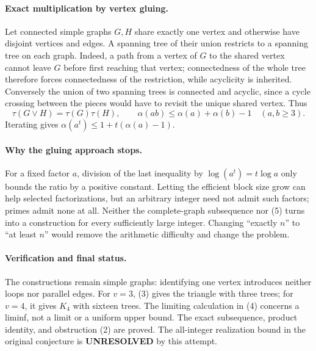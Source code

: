 \documentclass[11pt,a4paper]{article}
\begin{document}
\paragraph{Exact multiplication by vertex gluing.}
Let connected simple graphs $G,H$ share exactly one vertex and otherwise have disjoint vertices and edges. A spanning tree of their union restricts to a spanning tree on each graph. Indeed, a path from a vertex of $G$ to the shared vertex cannot leave $G$ before first reaching that vertex; connectedness of the whole tree therefore forces connectedness of the restriction, while acyclicity is inherited. Conversely the union of two spanning trees is connected and acyclic, since a cycle crossing between the pieces would have to revisit the unique shared vertex. Thus
\[
 \tau(G\vee H)=\tau(G)\tau(H),\qquad
 \alpha(ab)\le\alpha(a)+\alpha(b)-1 \quad(a,b\ge3). \tag{5}
\]
Iterating gives $\alpha(a^t)\le1+t(\alpha(a)-1)$.

\paragraph{Why the gluing approach stops.}
For a fixed factor $a$, division of the last inequality by $\log(a^t)=t\log a$ only bounds the ratio by a positive constant. Letting the efficient block size grow can help selected factorizations, but an arbitrary integer need not admit such factors; primes admit none at all. Neither the complete-graph subsequence nor (5) turns into a construction for every sufficiently large integer. Changing ``exactly $n$'' to ``at least $n$'' would remove the arithmetic difficulty and change the problem.

\paragraph{Verification and final status.}
The constructions remain simple graphs: identifying one vertex introduces neither loops nor parallel edges. For $v=3$, (3) gives the triangle with three trees; for $v=4$, it gives $K_4$ with sixteen trees. The limiting calculation in (4) concerns a liminf, not a limit or a uniform upper bound. The exact subsequence, product identity, and obstruction (2) are proved. The all-integer realization bound in the original conjecture is \textbf{UNRESOLVED} by this attempt.
\end{document}
